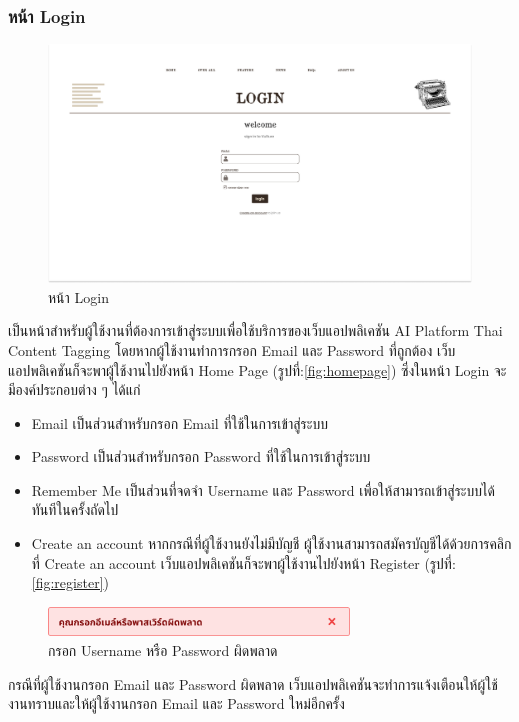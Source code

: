 \documentclass[12pt,oneside,openright,a4paper]{cpe-thai-project}
\begin{document}
\subsubsection{หน้า Login}
\begin{figure}[!ht]\centering
  \includegraphics[width=14cm]{./img/project_ui/login.png} 
  \caption{หน้า Login}\label{fig:login} 
\end{figure}
\hspace*{1cm}เป็นหน้าสำหรับผู้ใช้งานที่ต้องการเข้าสู่ระบบเพื่อใช้บริการของเว็บแอปพลิเคชัน AI Platform Thai Content Tagging 
โดยหากผู้ใช้งานทำการกรอก Email และ Password ที่ถูกต้อง เว็บแอปพลิเคชันก็จะพาผู้ใช้งานไปยังหน้า Home Page (รูปที่:\ref{fig:homepage})
ซึ่งในหน้า Login จะมีองค์ประกอบต่าง ๆ ได้แก่ 
\begin{itemize}
  \item Email เป็นส่วนสำหรับกรอก Email ที่ใช้ในการเข้าสู่ระบบ
  \item Password เป็นส่วนสำหรับกรอก Password ที่ใช้ในการเข้าสู่ระบบ
  \item Remember Me เป็นส่วนที่จดจำ Username และ Password เพื่อให้สามารถเข้าสู่ระบบได้ทันทีในครั้งถัดไป
  \item Create an account หากกรณีที่ผู้ใช้งานยังไม่มีบัญชี ผู้ใช้งานสามารถสมัครบัญชีได้ด้วยการคลิกที่ Create an account เว็บแอปพลิเคชันก็จะพาผู้ใช้งานไปยังหน้า Register (รูปที่:\ref{fig:register})
\end{itemize}
\begin{figure}[!ht]\centering
  \includegraphics[width=8cm]{./img/project_ui/login_fail.png} 
  \caption{กรอก Username หรือ Password ผิดพลาด}\label{fig:login_fail} 
\end{figure}
\hspace*{1cm}กรณีที่ผู้ใช้งานกรอก Email และ Password ผิดพลาด เว็บแอปพลิเคชันจะทำการแจ้งเตือนให้ผู้ใช้งานทราบและให้ผู้ใช้งานกรอก Email และ Password ใหม่อีกครั้ง
\end{document}
